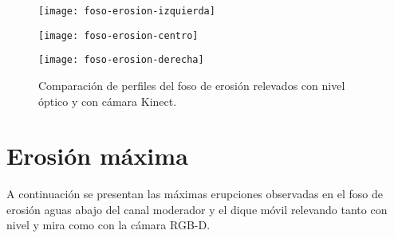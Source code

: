 \begin{figure}[ht]
\centering
\begin{minipage}[h]{.45\textwidth}
\begin{center}
\texttt{[image: foso-erosion-izquierda]}
\end{center}
\end{minipage}
\hfill
\begin{minipage}[h]{.45\textwidth}
\begin{center}
\texttt{[image: foso-erosion-centro]}
\end{center}
\end{minipage}
\hfill
\begin{minipage}[h]{.45\textwidth}
\begin{center}
\texttt{[image: foso-erosion-derecha]}
\end{center}
\end{minipage}
\hfill
\caption[Comparación de perfiles del foso de erosión con nivel óptico y cámara Kinect]
{Comparación de perfiles del foso de erosión relevados con nivel óptico y con cámara Kinect.}
\label{fig:comparacion-perfiles}
\end{figure}

\newpage %

\section{Erosión máxima}
A continuación se presentan las máximas erupciones observadas en el foso de erosión aguas abajo del canal moderador y el dique móvil relevando tanto con nivel y mira como con la cámara RGB-D.

